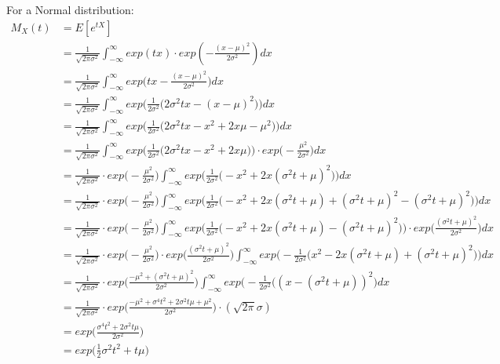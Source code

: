 \item For a Normal distribution:
{\setlength{\jot}{9pt}
\begin{align*}
M_{X} (t) &= E[e^{tX}] \\
&= \frac{1}{\sqrt{2\pi\sigma^2}} \int_{- \infty}^{\infty} exp(tx) \cdot exp(-\frac{(x - \mu)^2}{2\sigma^2})dx \\
&= \frac{1}{\sqrt{2\pi\sigma^2}} \int_{- \infty}^{\infty} exp \Big( tx -\frac{(x - \mu)^2}{2\sigma^2} \Big)dx \\
&= \frac{1}{\sqrt{2\pi\sigma^2}} \int_{- \infty}^{\infty} exp \Big(\frac{1}{2\sigma^2}
\Big( 2\sigma^2 tx - (x - \mu)^2 \Big) \Big)dx \\
&= \frac{1}{\sqrt{2\pi\sigma^2}} \int_{- \infty}^{\infty} exp \Big(\frac{1}{2\sigma^2}
\Big( 2\sigma^2 tx - x^2 +2 x \mu - \mu^2 \Big) \Big) dx \\
&= \frac{1}{\sqrt{2\pi\sigma^2}} \int_{- \infty}^{\infty} exp \Big(\frac{1}{2\sigma^2}
\Big( 2\sigma^2 tx - x^2 +2 x \mu \Big) \Big) \cdot exp \Big( - \frac{\mu^2}{2\sigma^2} \Big) dx \\
&= \frac{1}{\sqrt{2\pi\sigma^2}} \cdot exp \Big( - \frac{\mu^2}{2\sigma^2} \Big)
\int_{- \infty}^{\infty} exp \Big(\frac{1}{2\sigma^2} \Big( - x^2 + 2x (\sigma^2 t +\mu)^2 \Big) \Big) dx \\
&= \frac{1}{\sqrt{2\pi\sigma^2}} \cdot exp \Big( - \frac{\mu^2}{2\sigma^2} \Big) \int_{- \infty}^{\infty} exp \Big(
\frac{1}{2\sigma^2} \Big( - x^2 + 2x (\sigma^2 t +\mu) + (\sigma^2 t +\mu)^2 - (\sigma^2 t +\mu)^2 \Big) \Big) dx \\
&= \frac{1}{\sqrt{2\pi\sigma^2}} \cdot exp \Big( - \frac{\mu^2}{2\sigma^2} \Big) \int_{- \infty}^{\infty} exp \Big(
\frac{1}{2\sigma^2} \Big( - x^2 + 2x (\sigma^2 t +\mu) - (\sigma^2 t +\mu)^2 \Big) \Big) \cdot
exp \Big( \frac{(\sigma^2 t +\mu)^2}{2 \sigma^2} \Big) dx \\
&= \frac{1}{\sqrt{2\pi\sigma^2}} \cdot exp \Big( - \frac{\mu^2}{2\sigma^2} \Big) \cdot exp \Big(
\frac{(\sigma^2 t +\mu)^2}{2 \sigma^2} \Big) \int_{- \infty}^{\infty} exp \Big(- \frac{1}{2\sigma^2}
\Big( x^2 - 2x (\sigma^2 t  +\mu) + (\sigma^2 t +\mu)^2 \Big) \Big) dx \\
&= \frac{1}{\sqrt{2\pi\sigma^2}} \cdot exp \Big( \frac{ -\mu^2 + (\sigma^2 t +\mu)^2}{2 \sigma^2} \Big)
\int_{-\infty}^{\infty} exp \Big(- \frac{1}{2\sigma^2} \Big( (x - (\sigma^2 t + \mu))^2 \Big) dx \\
&= \frac{1}{\sqrt{2\pi\sigma^2}} \cdot exp \Big( \frac{ -\mu^2
+ \sigma^4 t^2 + 2 \sigma^2 t \mu + \mu^2}{2 \sigma^2} \Big) \cdot (\sqrt{2\pi} \sigma) \\
&= exp \Big( \frac{\sigma^4 t^2 + 2 \sigma^2 t \mu}{2 \sigma^2} \Big) \\
&= exp \Big(\frac{1}{2} \sigma^2 t^2 + t \mu \Big)
\end{align*}}

